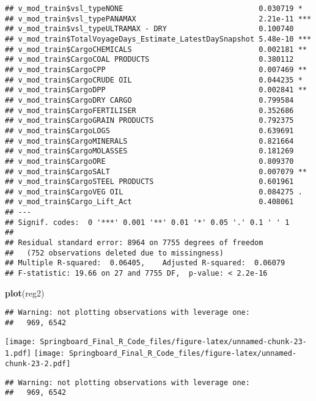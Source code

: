 \documentclass[]{article}
\newenvironment{Shaded}{\begin{snugshade}}{\end{snugshade}}
\newcommand{\KeywordTok}[1]{\textcolor[rgb]{0.13,0.29,0.53}{\textbf{#1}}}
\newcommand{\NormalTok}[1]{#1}
\begin{document}
\begin{verbatim}
## v_mod_train$vsl_typeNONE                               0.030719 *  
## v_mod_train$vsl_typePANAMAX                            2.21e-11 ***
## v_mod_train$vsl_typeULTRAMAX - DRY                     0.100740    
## v_mod_train$TotalVoyageDays_Estimate_LatestDaySnapshot 5.48e-10 ***
## v_mod_train$CargoCHEMICALS                             0.002181 ** 
## v_mod_train$CargoCOAL PRODUCTS                         0.380112    
## v_mod_train$CargoCPP                                   0.007469 ** 
## v_mod_train$CargoCRUDE OIL                             0.044235 *  
## v_mod_train$CargoDPP                                   0.002841 ** 
## v_mod_train$CargoDRY CARGO                             0.799584    
## v_mod_train$CargoFERTILISER                            0.352686    
## v_mod_train$CargoGRAIN PRODUCTS                        0.792375    
## v_mod_train$CargoLOGS                                  0.639691    
## v_mod_train$CargoMINERALS                              0.821664    
## v_mod_train$CargoMOLASSES                              0.181269    
## v_mod_train$CargoORE                                   0.809370    
## v_mod_train$CargoSALT                                  0.007079 ** 
## v_mod_train$CargoSTEEL PRODUCTS                        0.601961    
## v_mod_train$CargoVEG OIL                               0.084275 .  
## v_mod_train$Cargo_Lift_Act                             0.408061    
## ---
## Signif. codes:  0 '***' 0.001 '**' 0.01 '*' 0.05 '.' 0.1 ' ' 1
## 
## Residual standard error: 8964 on 7755 degrees of freedom
##   (752 observations deleted due to missingness)
## Multiple R-squared:  0.06405,    Adjusted R-squared:  0.06079 
## F-statistic: 19.66 on 27 and 7755 DF,  p-value: < 2.2e-16
\end{verbatim}

\begin{Shaded}
\begin{Highlighting}[]
\KeywordTok{plot}\NormalTok{(reg2)}
\end{Highlighting}
\end{Shaded}

\begin{verbatim}
## Warning: not plotting observations with leverage one:
##   969, 6542
\end{verbatim}

\texttt{[image: Springboard\_Final\_R\_Code\_files/figure-latex/unnamed-chunk-23-1.pdf]}
\texttt{[image: Springboard\_Final\_R\_Code\_files/figure-latex/unnamed-chunk-23-2.pdf]}

\begin{verbatim}
## Warning: not plotting observations with leverage one:
##   969, 6542
\end{verbatim}
\end{document}
